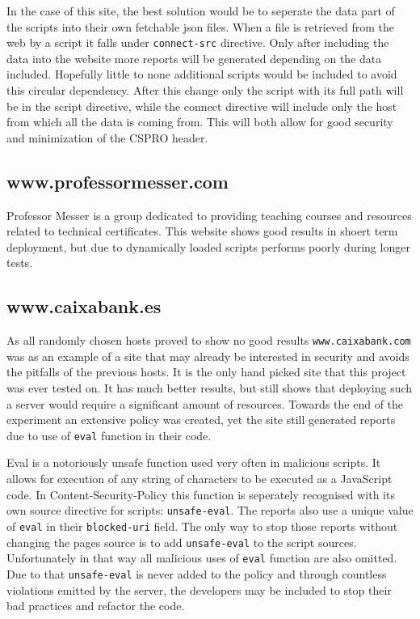 \begin{description}
In the case of this site, the best solution would be to seperate the data part of the scripts into their own fetchable json files.
When a file is retrieved from the web by a script it falls under \texttt{connect-src} directive. 
Only after including the data into the website more reports will be generated depending on the data included.
Hopefully little to none additional scripts would be included to avoid this circular dependency.
After this change only the script with its full path will be in the script directive, while the connect directive will include only the host from which all the data is coming from.
This will both allow for good security and minimization of the CSPRO header.


\subsection{www.professormesser.com}

Professor Messer is a group dedicated to providing teaching courses and resources related to technical certificates.
This website shows good results in shoert term deployment, but due to dynamically loaded scripts performs poorly during longer tests.


\subsection{www.caixabank.es}

As all randomly chosen hosts proved to show no good results \texttt{www.caixabank.com} was as an example of a site that may already be interested in security and avoids the pitfalls of the previous hosts.
It is the only hand picked site that this project was ever tested on. 
It has much better results, but still shows that deploying such a server would require a significant amount of resources.
Towards the end of the experiment an extensive policy was created, yet the site still generated reports due to use of \texttt{eval} function in their code.

Eval is a notoriously unsafe function used very often in malicious scripts. 
It allows for execution of any string of characters to be executed as a JavaScript code. 
In Content-Security-Policy this function is seperately recognised with its own source directive for scripts: \texttt{unsafe-eval}.
The reports also use a unique value of \texttt{eval} in their \texttt{blocked-uri} field.
The only way to stop those reports without changing the pages source is to add \texttt{unsafe-eval} to the script sources.
Unfortunately in that way all malicious uses of \texttt{eval} function are also omitted.
Due to that \texttt{unsafe-eval} is never added to the policy and through countless violations emitted by the server, the developers may be included to stop their bad practices and refactor the code.


\end{description}

